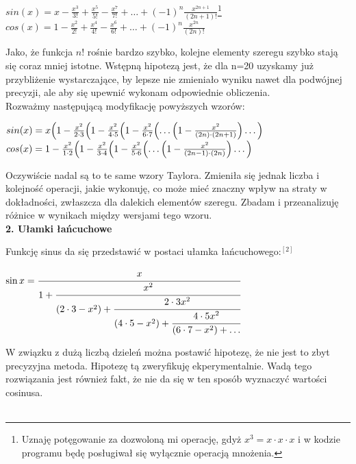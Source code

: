 \documentclass[a4paper]{article}
\begin{document}
\begin{center}
\large
$sin(x) = x - \frac{x^3}{3!} + \frac{x^5}{5!} - \frac{x^7}{7!} + \dots + (-1)^n\frac{x^{2n+1}}{(2n+1)!}$\footnote{Uznaję potęgowanie za dozwoloną mi operację, gdyż $x^3 = x \cdot x \cdot x$ i w kodzie programu będę posługiwał się wyłącznie operacją mnożenia.}\\
$cos(x) = 1 - \frac{x^2}{2!} + \frac{x^4}{4!} - \frac{x^6}{6!} + \dots + (-1)^n\frac{x^{2n}}{(2n)!}$\\
\end{center}
Jako, że funkcja $n!$ rośnie bardzo szybko, kolejne elementy szeregu szybko stają się coraz mniej istotne. Wstępną hipotezą jest, że dla n=20 uzyskamy już przybliżenie wystarczające, by lepsze nie zmieniało wyniku nawet dla podwójnej precyzji, ale aby się upewnić wykonam odpowiednie obliczenia.\\
Rozważmy następującą modyfikację powyższych wzorów:
\begin{center}
\large
$sin(x) = x \Bigl(1 - \frac{x^2}{2 \cdot 3} \Bigl(1 - \frac{x^2}{4 \cdot 5}\Bigl( 1 - \frac{x^2}{6 \cdot 7} \Bigl( \dots \Bigl(1 - \frac{x^2}{(2n) \cdot (2n+1)} \Bigr)\dots \Bigr)$\\
$cos(x) = 1 - \frac{x^2}{1 \cdot 2} \Bigl(1 - \frac{x^2}{3 \cdot 4}\Bigl(1 - \frac{x^2}{5 \cdot 6}\Bigl( \dots \Bigl(1 - \frac{x^2}{(2n-1) \cdot (2n)}\Bigr) \dots \Bigr)$\\
\end{center}
Oczywiście nadal są to te same wzory Taylora. Zmieniła się jednak liczba i kolejność operacji, jakie wykonuję, co może mieć znaczny wpływ na straty w dokładności, zwłaszcza dla dalekich elementów szeregu. Zbadam i przeanalizuję różnice w wynikach między wersjami tego wzoru.\\

\textbf{2. Ułamki łańcuchowe}

Funkcję sinus da się przedstawić w postaci ułamka łańcuchowego:$^{[2]}$
\begin{center}
\large
$\sin x={\cfrac  {x}{1+{\cfrac  {x^{2}}{(2\cdot 3-x^{2})+{\cfrac  {2\cdot 3x^{2}}{(4\cdot 5-x^{2})+{\cfrac  {4\cdot 5x^{2}}{(6\cdot 7-x^{2})+\dots }}}}}}}}$
\end{center}
W związku z dużą liczbą dzieleń można postawić hipotezę, że nie jest to zbyt precyzyjna metoda. Hipotezę tą zweryfikuję ekperymentalnie. Wadą tego rozwiązania jest również fakt, że nie da się w ten sposób wyznaczyć wartości cosinusa.\\\\
\newpage
\end{document}
